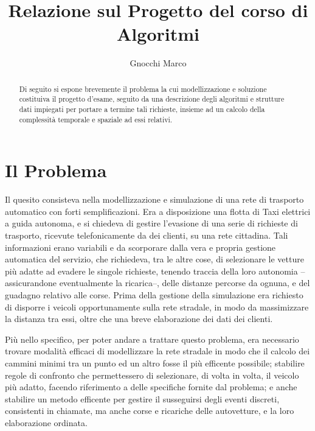 \documentclass[a4paper,11pt]{Article}
\begin{document}
\makeatletter
{}
\makeatother

\newcommand{\R}[1]{$\mathbb{R}^#1$} %
\newtheorem{theorem}{Teorema}[section]
\newtheorem{defn}{Definizione}[section]

\author{Gnocchi Marco}
\title{Relazione sul Progetto del corso di Algoritmi}

\maketitle

\begin{abstract}
Di seguito si espone brevemente il problema la cui modellizzazione e soluzione costituiva il progetto d'esame, seguito da una descrizione degli algoritmi e strutture dati impiegati per portare a termine tali richieste, insieme ad un calcolo della complessità temporale e spaziale ad essi relativi.


\end{abstract}
\clearpage   %


\tableofcontents
\clearpage   %


\section{Il Problema}

Il quesito consisteva nella modellizzazione e simulazione di una rete di trasporto automatico con forti semplificazioni.
Era a disposizione una flotta di Taxi elettrici a guida autonoma, e si chiedeva di gestire l'evasione di una serie di richieste di trasporto, ricevute telefonicamente da dei clienti, su una rete cittadina.
Tali informazioni erano variabili e da scorporare dalla vera e propria gestione automatica del servizio, che richiedeva, tra le altre cose, di selezionare le vetture più adatte ad evadere le singole richieste, tenendo traccia della loro autonomia --assicurandone eventualmente la ricarica--, delle distanze percorse da ognuna, e del guadagno relativo alle corse.
Prima della gestione della simulazione era richiesto di disporre i veicoli opportunamente sulla rete stradale, in modo da massimizzare la distanza tra essi, oltre che una breve elaborazione dei dati dei clienti.

Più nello specifico, per poter andare a trattare questo problema, era necessario trovare modalità efficaci di modellizzare la rete stradale in modo che il calcolo dei cammini minimi tra un punto ed un altro fosse il più efficente possibile; stabilire regole di confronto che permettessero di selezionare, di volta in volta, il veicolo più adatto, facendo riferimento a delle specifiche fornite dal problema; e anche stabilire un metodo efficente per gestire il susseguirsi degli eventi discreti, consistenti in chiamate, ma anche corse e ricariche delle autovetture, e la loro elaborazione ordinata.
\end{document}
